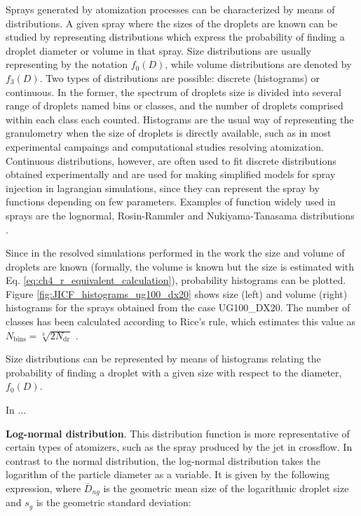 Sprays generated by atomization processes can be characterized by means of distributions. A given spray where the sizes of the droplets are known can be studied by representing distributions which express the probability of finding a droplet diameter or volume in that spray. Size distributions are usually representing by the notation $f_0 \left( D \right)$, while volume distributions are denoted by $f_3 \left( D \right)$. Two types of distributions are possible: discrete (histograms) or continuous. In the former, the spectrum of droplets size is divided into several range of droplets named bins or classes, and the number of droplets comprised within each class each counted. Histograms are the usual way of representing the granulometry when the size of droplets is directly available, such as in most experimental campaings and computational studies resolving atomization. Continuous distributions, however, are often used to fit discrete distributions obtained experimentally and are used for making simplified models for spray injection in lagrangian simulations, since they can represent the spray by functions depending on few parameters. Examples of function widely used in sprays are the lognormal, Rosin-Rammler and Nukiyama-Tanasama distributions . 

Since in the resolved simulations performed in the work the size and volume of droplets are known (formally, the volume is known but the size is estimated with Eq. \ref{eq:ch4_r_equivalent_calculation}), probability histograms can be plotted. Figure \ref{fig:JICF_histograms_ug100_dx20} shows size (left) and volume (right) histograms for the sprays obtained from the case UG100\_DX20. The number of classes has been calculated according to Rice's rule, which estimates this value as $N_\mathrm{bins} = \sqrt[3]{2 N_\mathrm{dr}}$ .




Size distributions can be represented by means of histograms relating the probability of finding a droplet with a given size with respect to the diameter, $f_0 \left( D \right)$.



In  ...



\textbf{Log-normal distribution}. This distribution function is more representative of certain types of atomizers, such as the spray produced by the jet in crossflow. In contrast to the normal distribution, the log-normal distribution takes the logarithm of the particle diameter as a variable. It is given by the following expression, where $\overline{D}_{ng}$ is the geometric mean size of the logarithmic droplet size and $s_g$ is the geometric standard deviation:

